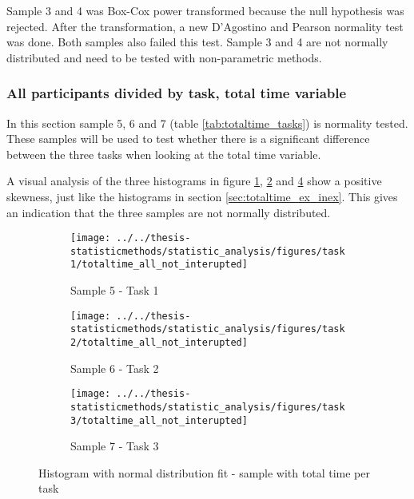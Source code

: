 Sample 3 and 4 was Box-Cox power transformed because the null hypothesis was rejected. After the transformation, a new D'Agostino and Pearson normality test was done. Both samples also failed this test. Sample 3 and 4 are not normally distributed and need to be tested with non-parametric methods. 

\subsubsection[Sample 5, 6 and 7]{All participants divided by task, total time variable}\label{sec:task123_time_normaltest}

In this section sample 5, 6 and 7 (table \ref{tab:totaltime_tasks}) is normality tested. These samples will be used to test whether there is a significant difference between the three tasks when looking at the total time variable. 

A visual analysis of the three histograms in figure \ref{fig:totaltimeallnotinterupted_task1}, \ref{fig:totaltimeallnotinterupted_task2} and \ref{fig:totaltimeallnotinterupted_task3} show a positive skewness, just like the histograms in section \ref{sec:totaltime_ex_inex}. This gives an indication that the three samples are not normally distributed. 

\begin{figure}[h!]
	\centering
	\begin{subfigure}[b]{0.3\textwidth}
		\centering
		\texttt{[image: ../../thesis-statisticmethods/statistic\_analysis/figures/task1/totaltime\_all\_not\_interupted]}
		\caption{Sample 5 - Task 1}
		\label{fig:totaltimeallnotinterupted_task1}
	\end{subfigure}
	\begin{subfigure}[b]{0.3\textwidth}
		\centering
		\texttt{[image: ../../thesis-statisticmethods/statistic\_analysis/figures/task2/totaltime\_all\_not\_interupted]}
		\caption{Sample 6 - Task 2}
		\label{fig:totaltimeallnotinterupted_task2}
	\end{subfigure}
	\begin{subfigure}[b]{0.3\textwidth}
		\centering
		\texttt{[image: ../../thesis-statisticmethods/statistic\_analysis/figures/task3/totaltime\_all\_not\_interupted]}
		\caption{Sample 7 - Task 3}
		\label{fig:totaltimeallnotinterupted_task3}
	\end{subfigure}
	\caption{Histogram with normal distribution fit - sample with total time per task}
\end{figure}

